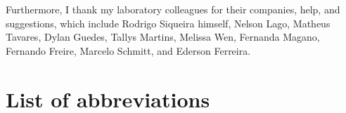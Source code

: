 Furthermore, I thank my laboratory colleagues for their companies, help, and
suggestions, which include Rodrigo Siqueira himself, Nelson Lago, Matheus
Tavares, Dylan Guedes, Tallys Martins, Melissa Wen, Fernanda Magano, Fernando
Freire, Marcelo Schmitt, and Ederson Ferreira.

\printResumoAbstract



\makeatletter
\if@openright\cleardoublepage\else\clearpage\fi
\makeatother


\newcommand\disablenewpage[1]{{\let\clearpage\par\let\cleardoublepage\par #1}}

\bgroup
\raggedbottom


\disablenewpage{\chapter*{List of abbreviations}}

